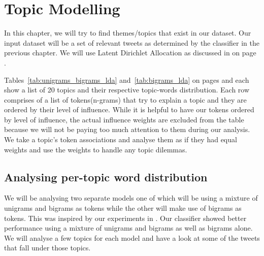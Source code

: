 \chapter{Topic Modelling}
\label{cha:topic_modelling}
In this chapter, we will try to find themes/topics that exist in our dataset. Our input dataset will
be a set of relevant tweets as determined by the classifier in the previous chapter. We will use
Latent Dirichlet Allocation as discussed in  on page \pageref{sec:bg_lda}.

Tables~\ref{tab:unigrams_bigrams_lda} and~\ref{tab:bigrams_lda} on pages
\pageref{tab:unigrams_bigrams_lda} and \pageref{tab:bigrams_lda} each show a list of 20 topics and
their respective topic-words distribution. Each row comprises of a list of tokens(n-grams) that try
to explain a topic and they are ordered by their level of influence. While it is helpful to have our
tokens ordered by level of influence, the actual influence weights are excluded from the table
because we will not be paying too much attention to them during our analysis. We take a topic's
token associations and analyse them as if they had equal weights and use the weights to handle any
topic dilemmas.

\section{Analysing per-topic word distribution}
\label{sec:analysing_topic_word_distribution}
We will be analysing two separate models one of which will be using a mixture of unigrams and
bigrams as tokens while the other will make use of bigrams as tokens. This was inspired by our
experiments in . Our classifier showed better performance using
a mixture of unigrams and bigrams as well as bigrams alone. We will analyse a few topics for each
model and have a look at some of the tweets that fall under those topics.


